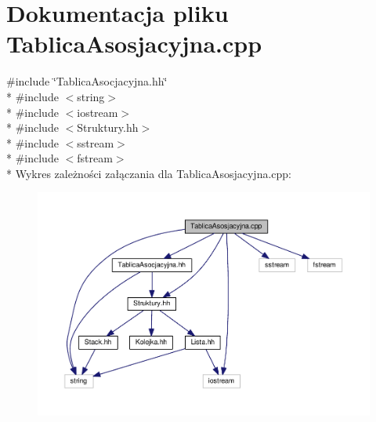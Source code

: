 \section{Dokumentacja pliku Tablica\-Asosjacyjna.\-cpp}
\label{_tablica_asosjacyjna_8cpp}
{\ttfamily \#include \char`\"{}Tablica\-Asocjacyjna.\-hh\char`\"{}}\\*
{\ttfamily \#include $<$string$>$}\\*
{\ttfamily \#include $<$iostream$>$}\\*
{\ttfamily \#include $<$Struktury.\-hh$>$}\\*
{\ttfamily \#include $<$sstream$>$}\\*
{\ttfamily \#include $<$fstream$>$}\\*
Wykres zależności załączania dla Tablica\-Asosjacyjna.\-cpp\-:
\nopagebreak
\begin{figure}[H]
\begin{center}
\leavevmode
\includegraphics[width=350pt]{_tablica_asosjacyjna_8cpp__incl}
\end{center}
\end{figure}
